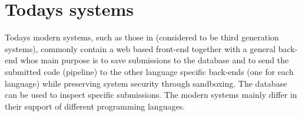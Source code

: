 \section{Todays systems} \label{sec:todays_systems}
Todays modern systems, such as those in \cite{Gradebot} \cite{Suleman} \cite{GenerationReview}  \cite{Kattis} \cite{Amelung} (considered to be third generation systems), commonly contain a web based front-end together with a general back-end whos main purpose is to save submissions to the database and to send the submitted code (pipeline) to the other language specific back-ends (one for each language) while preserving system security through sandboxing. The database can be used to inspect specific submissions. The modern systems mainly differ in their support of different programming languages. 